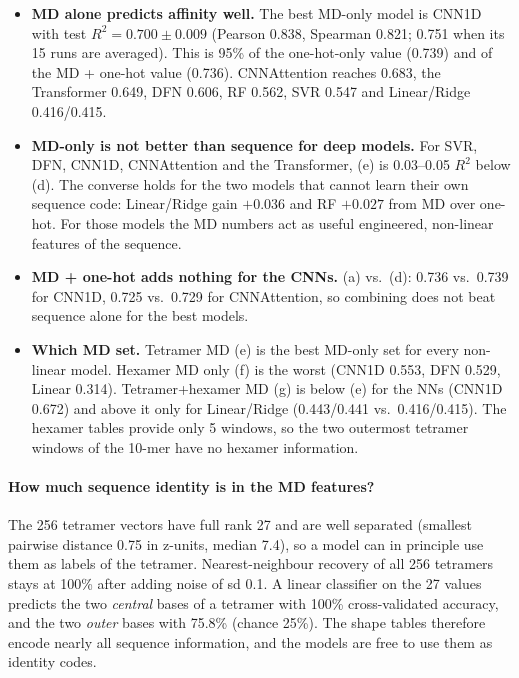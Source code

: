 \begin{itemize}
\item \textbf{MD alone predicts affinity well.} The best MD-only model is CNN1D with test $R^2=0.700\pm0.009$ (Pearson 0.838, Spearman 0.821; 0.751 when its 15 runs are averaged). This is 95\% of the one-hot-only value (0.739) and of the MD + one-hot value (0.736). CNNAttention reaches 0.683, the Transformer 0.649, DFN 0.606, RF 0.562, SVR 0.547 and Linear/Ridge 0.416/0.415.
\item \textbf{MD-only is not better than sequence for deep models.} For SVR, DFN, CNN1D, CNNAttention and the Transformer, (e) is 0.03--0.05 $R^2$ below (d). The converse holds for the two models that cannot learn their own sequence code: Linear/Ridge gain $+0.036$ and RF $+0.027$ from MD over one-hot. For those models the MD numbers act as useful engineered, non-linear features of the sequence.
\item \textbf{MD + one-hot adds nothing for the CNNs.} (a) vs.\ (d): 0.736 vs.\ 0.739 for CNN1D, 0.725 vs.\ 0.729 for CNNAttention, so combining does not beat sequence alone for the best models.
\item \textbf{Which MD set.} Tetramer MD (e) is the best MD-only set for every non-linear model. Hexamer MD only (f) is the worst (CNN1D 0.553, DFN 0.529, Linear 0.314). Tetramer+hexamer MD (g) is below (e) for the NNs (CNN1D 0.672) and above it only for Linear/Ridge (0.443/0.441 vs.\ 0.416/0.415). The hexamer tables provide only 5 windows, so the two outermost tetramer windows of the 10-mer have no hexamer information.
\end{itemize}

\paragraph{How much sequence identity is in the MD features?}
The 256 tetramer vectors have full rank 27 and are well separated (smallest pairwise distance 0.75 in z-units, median 7.4), so a model can in principle use them as labels of the tetramer. Nearest-neighbour recovery of all 256 tetramers stays at 100\% after adding noise of sd 0.1. A linear classifier on the 27 values predicts the two \emph{central} bases of a tetramer with 100\% cross-validated accuracy, and the two \emph{outer} bases with 75.8\% (chance 25\%). The shape tables therefore encode nearly all sequence information, and the models are free to use them as identity codes.

